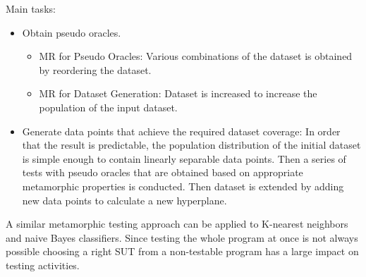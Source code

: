 Main tasks:
\begin{itemize}
  \item Obtain pseudo oracles.
  \begin{itemize}
    \item MR for Pseudo Oracles: Various combinations of the dataset is obtained by reordering the dataset.
    \item MR for Dataset Generation: Dataset is increased to increase the population of the input dataset.
  \end{itemize}
  \item Generate data points that achieve the required dataset coverage: In order that the result is predictable, the population distribution of the initial dataset is simple enough to contain linearly separable data points. Then a series of tests with pseudo oracles that are obtained based on appropriate metamorphic properties is conducted. Then dataset is extended by adding new data points to calculate a new hyperplane.
\end{itemize}
A similar metamorphic testing approach can be applied to K-nearest neighbors and naive Bayes classifiers. Since testing the whole program at once is not always possible choosing a right SUT from a non-testable program has a large impact on testing activities.
